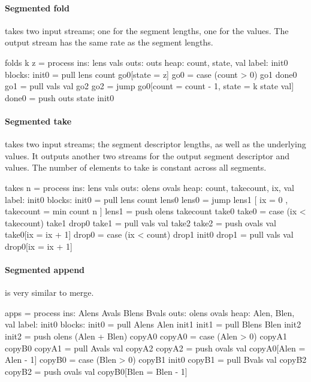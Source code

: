 \paragraph{Segmented fold}
takes two input streams; one for the segment lengths, one for the values.
The output stream has the same rate as the segment lengths.

\begin{code}
folds k z = process
     ins: lens vals
    outs: outs
    heap: {count, state, val}
   label: init0
  blocks: init0 = pull lens count go0[state = z]
          go0   = case (count > 0) go1 done0
          go1   = pull vals val    go2
          go2   = jump go0[count = count - 1, state = k state val]
          done0 = push outs state init0
\end{code}


\paragraph{Segmented take}
takes two input streams; the segment descriptor lengths, as well as the underlying values.
It outputs another two streams for the output segment descriptor and values.
The number of elements to take is constant across all segments.

\begin{code}
takes n = process
     ins: lens vals
    outs: olens ovals
    heap: {count, takecount, ix, val}
   label: init0
  blocks: init0 = pull lens count lens0
          lens0 = jump lens1
                [ ix = 0
                , takecount = min count n ]
          lens1 = push olens takecount take0
          take0 = case (ix < takecount) take1 drop0
          take1 = pull vals val take2
          take2 = push ovals val take0[ix = ix + 1]
          drop0 = case (ix < count) drop1 init0
          drop1 = pull vals val drop0[ix = ix + 1]
\end{code}

\paragraph{Segmented append} is very similar to merge.

\begin{code}
apps = process
     ins: Alens Avals Blens Bvals
    outs: olens ovals
    heap: {Alen, Blen, val}
   label: init0
  blocks: init0 = pull Alens Alen init1
          init1 = pull Blens Blen init2
          init2 = push olens  (Alen + Blen) copyA0
          copyA0 = case (Alen > 0) copyA1 copyB0
          copyA1 = pull Avals val copyA2
          copyA2 = push ovals val copyA0[Alen = Alen - 1]
          copyB0 = case (Blen > 0) copyB1 init0
          copyB1 = pull Bvals val copyB2
          copyB2 = push ovals val copyB0[Blen = Blen - 1]
\end{code}

